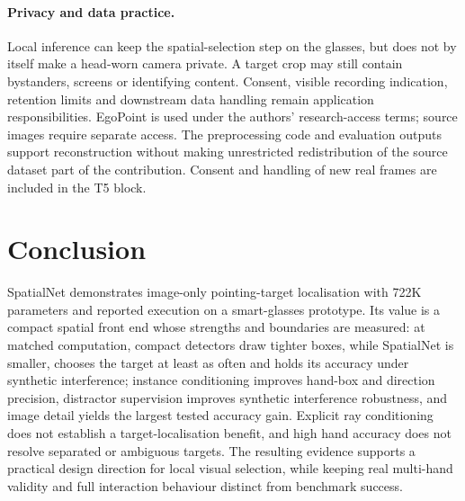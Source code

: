 \paragraph{Privacy and data practice.}
Local inference can keep the spatial-selection step on the glasses, but does not by itself make a head-worn camera private. A target crop may still contain bystanders, screens or identifying content. Consent, visible recording indication, retention limits and downstream data handling remain application responsibilities. EgoPoint is used under the authors' research-access terms; source images require separate access. The preprocessing code and evaluation outputs support reconstruction without making unrestricted redistribution of the source dataset part of the contribution. Consent and handling of new real frames are included in the T5 block.

\section{Conclusion}
SpatialNet demonstrates image-only pointing-target localisation with 722K parameters and reported execution on a smart-glasses prototype. Its value is a compact spatial front end whose strengths and boundaries are measured: at matched computation, compact detectors draw tighter boxes, while SpatialNet is smaller, chooses the target at least as often and holds its accuracy under synthetic interference; instance conditioning improves hand-box and direction precision, distractor supervision improves synthetic interference robustness, and image detail yields the largest tested accuracy gain. Explicit ray conditioning does not establish a target-localisation benefit, and high hand accuracy does not resolve separated or ambiguous targets. The resulting evidence supports a practical design direction for local visual selection, while keeping real multi-hand validity and full interaction behaviour distinct from benchmark success.
